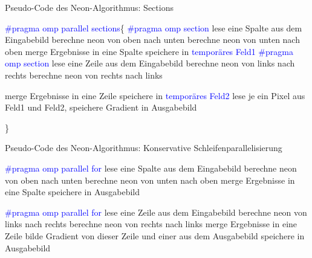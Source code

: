 \newpage
\begin{algorithm}[H]
\caption{Pseudo-Code des \glqq Neon\grqq-Algorithmus: Sections}
\label{algo:neon_sections}
\begin{algorithmic}[1]
\State \textcolor{blue}{\#pragma omp parallel sections}\{
\State \textcolor{blue}{\#pragma omp section} 
	\State lese eine Spalte aus dem Eingabebild
		\State berechne neon von oben nach unten
	\EndFor
		\State berechne neon von unten nach oben
	\EndFor
	\State merge Ergebnisse in eine Spalte
	\State speichere in \textcolor{blue}{temporäres Feld1}
\EndFor	
\State \textcolor{blue}{\#pragma omp section}
	\State lese eine Zeile aus dem Eingabebild
		\State berechne neon von links nach rechts
	\EndFor
		\State berechne neon von rechts nach links
	\EndFor	
	
		\State merge Ergebnisse in eine Zeile
	\State speichere in \textcolor{blue}{temporäres Feld2}
\EndFor
{}
	\State \label{neon_keine_datenabhaengigkeit} lese je ein Pixel aus Feld1 und Feld2,  speichere Gradient in Ausgabebild
\EndFor


\State \}
\end{algorithmic}
\end{algorithm}

\begin{algorithm}[H]
\caption{Pseudo-Code des \glqq Neon\grqq-Algorithmus: Konservative Schleifenparallelisierung}
\label{algo:neon_conservative}
\begin{algorithmic}[1]
\State \textcolor{blue}{\#pragma omp parallel for }
	\State lese eine Spalte aus dem Eingabebild
		\State berechne neon von oben nach unten
	\EndFor
		\State berechne neon von unten nach oben
	\EndFor
	\State merge Ergebnisse in eine Spalte
	\State speichere in Ausgabebild
\EndFor	


\State \textcolor{blue}{\#pragma omp parallel for }
	\State lese eine Zeile aus dem Eingabebild
		\State berechne neon von links nach rechts
	\EndFor
		\State berechne neon von rechts nach links
	\EndFor	
		\State merge Ergebnisse in eine Zeile
	\State bilde Gradient von dieser Zeile und einer aus dem Ausgabebild
	\State speichere in Ausgabebild
\EndFor
\end{algorithmic}
\end{algorithm}






















